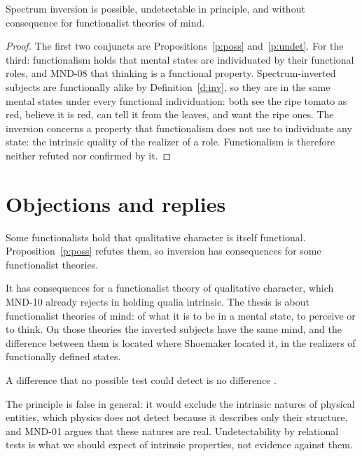 \documentclass{situationist-preprint}
\begin{document}
\begin{theorem}\label{t:main}
Spectrum inversion is possible, undetectable in principle, and without consequence for functionalist theories of mind.
\end{theorem}

\begin{proof}
The first two conjuncts are Propositions~\ref{p:poss} and~\ref{p:undet}. For the third: functionalism holds that mental states are individuated by their functional roles, and MND-08 that thinking is a functional property. Spectrum-inverted subjects are functionally alike by Definition~\ref{d:inv}, so they are in the same mental states under every functional individuation: both see the ripe tomato as red, believe it is red, can tell it from the leaves, and want the ripe ones. The inversion concerns a property that functionalism does not use to individuate any state: the intrinsic quality of the realizer of a role. Functionalism is therefore neither refuted nor confirmed by it.
\end{proof}

\section{Objections and replies}

\begin{objection}
Some functionalists hold that qualitative character is itself functional. Proposition~\ref{p:poss} refutes them, so inversion has consequences for some functionalist theories.
\end{objection}

\begin{reply}
It has consequences for a functionalist theory of qualitative character, which MND-10 already rejects in holding qualia intrinsic. The thesis is about functionalist theories of mind: of what it is to be in a mental state, to perceive or to think. On those theories the inverted subjects have the same mind, and the difference between them is located where Shoemaker located it, in the realizers of functionally defined states.
\end{reply}

\begin{objection}[Verificationism]
A difference that no possible test could detect is no difference \citep{Dennett1988}.
\end{objection}

\begin{reply}
The principle is false in general: it would exclude the intrinsic natures of physical entities, which physics does not detect because it describes only their structure, and MND-01 argues that these natures are real. Undetectability by relational tests is what we should expect of intrinsic properties, not evidence against them.
\end{reply}
\end{document}
